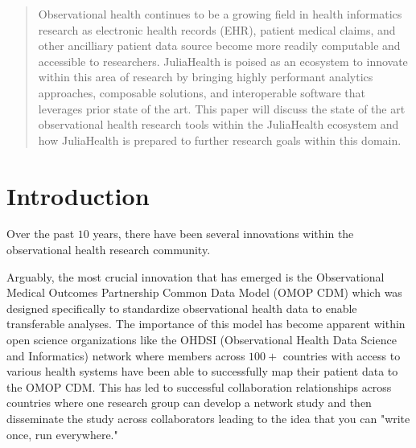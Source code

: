 \documentclass{juliacon}
\begin{document}


\maketitle

\begin{abstract}

Observational health continues to be a growing field in health informatics research as electronic health records (EHR), patient medical claims, and other ancilliary patient data source become more readily computable and accessible to researchers.
JuliaHealth is poised as an ecosystem to innovate within this area of research by bringing highly performant analytics approaches, composable solutions, and interoperable software that leverages prior state of the art. 
This paper will discuss the state of the art observational health research tools within the JuliaHealth ecosystem and how JuliaHealth is prepared to further research goals within this domain.

\end{abstract}

\section{Introduction}

Over the past $10$ years, there have been several innovations within the observational health research community.

Arguably, the most crucial innovation that has emerged is the Observational Medical Outcomes Partnership Common Data Model (OMOP CDM) which was designed specifically to standardize observational health data to enable transferable analyses.
The importance of this model has become apparent within open science organizations like the OHDSI (Observational Health Data Science and Informatics) network where members across $100+$ countries with access to various health systems have been able to successfully map their patient data to the OMOP CDM.
This has led to successful collaboration relationships across countries where one research group can develop a network study and then disseminate the study across collaborators leading to the idea that you can "write once, run everywhere."
\end{document}
